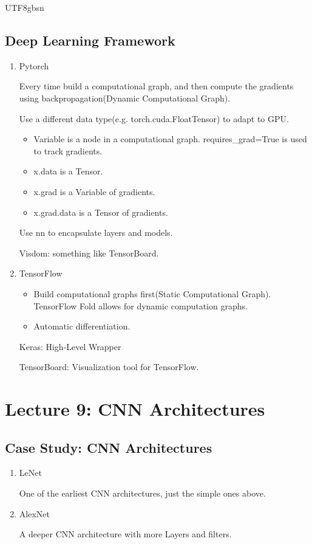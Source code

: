 \documentclass{article}
\numberwithin{equation}{section}
\begin{document}
\begin{CJK}{UTF8}{gbsn}
\subsection{Deep Learning Framework}
\begin{enumerate}
    \item Pytorch\par
    Every time build a computational graph, and then compute the gradients using backpropagation(Dynamic Computational Graph).\par
    Use a different data type(e.g. torch.cuda.FloatTensor) to adapt to GPU.\par
    \begin{itemize}
        \item Variable is a node in a computational graph. requires\_grad=True is used to track gradients.\par
        \item x.data is a Tensor.
        \item x.grad is a Variable of gradients.
        \item x.grad.data is a Tensor of gradients.
    \end{itemize}
    Use nn to encapsulate layers and models.\par  
    Visdom: something like TensorBoard.\par

    \item TensorFlow\par
    \begin{itemize}
        \item Build computational graphs first(Static Computational Graph). TensorFlow Fold allows for dynamic computation graphs.
        \item Automatic differentiation.
    \end{itemize}
    Keras: High-Level Wrapper\par
    TensorBoard: Visualization tool for TensorFlow.\par
\end{enumerate}
\newpage


\section*{Lecture 9: CNN Architectures}
\setcounter{section}{9}
\setcounter{subsection}{0}
\setcounter{equation}{0}

\subsection{Case Study: CNN Architectures}
\begin{enumerate}
    \item LeNet\par
    One of the earliest CNN architectures, just the simple ones above.\par
    \item AlexNet\par
    A deeper CNN architecture with more Layers and filters.\par


\end{enumerate}
\end{CJK}
\end{document}
